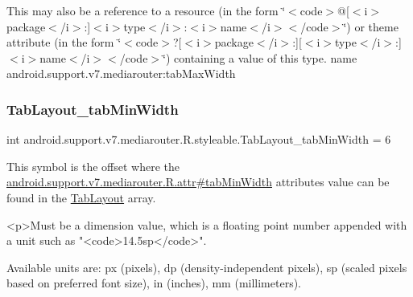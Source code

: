 This may also be a reference to a resource (in the form \char`\"{}$<$code$>$@\mbox{[}$<$i$>$package$<$/i$>$\+:\mbox{]}$<$i$>$type$<$/i$>$\+:$<$i$>$name$<$/i$>$$<$/code$>$\char`\"{}) or theme attribute (in the form \char`\"{}$<$code$>$?\mbox{[}$<$i$>$package$<$/i$>$\+:\mbox{]}\mbox{[}$<$i$>$type$<$/i$>$\+:\mbox{]}$<$i$>$name$<$/i$>$$<$/code$>$\char`\"{}) containing a value of this type.  name android.\+support.\+v7.\+mediarouter\+:tab\+Max\+Width \mbox{\label{classandroid_1_1support_1_1v7_1_1mediarouter_1_1R_1_1styleable_aafab3ca12beb8f67f351f2a9588d9050}} 
\subsubsection{\texorpdfstring{Tab\+Layout\+\_\+tab\+Min\+Width}{TabLayout\_tabMinWidth}}
{\footnotesize\ttfamily int android.\+support.\+v7.\+mediarouter.\+R.\+styleable.\+Tab\+Layout\+\_\+tab\+Min\+Width = 6\hspace{0.3cm}{\ttfamily [static]}}

This symbol is the offset where the \hyperlink{classandroid_1_1support_1_1v7_1_1mediarouter_1_1R_1_1attr_ad7f198acb179f92ba3cb636e16e779d2}{android.\+support.\+v7.\+mediarouter.\+R.\+attr\#tab\+Min\+Width} attribute\textquotesingle{}s value can be found in the \hyperlink{classandroid_1_1support_1_1v7_1_1mediarouter_1_1R_1_1styleable_a94de1350e0a902b4a974d775f2f4f25e}{Tab\+Layout} array.

\begin{DoxyVerb}      <p>Must be a dimension value, which is a floating point number appended with a unit such as "<code>14.5sp</code>".
\end{DoxyVerb}
 Available units are\+: px (pixels), dp (density-\/independent pixels), sp (scaled pixels based on preferred font size), in (inches), mm (millimeters). 

